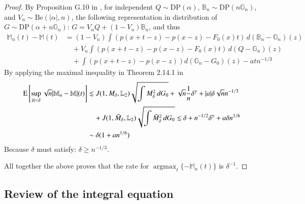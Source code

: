 \begin{proof}
By Proposition G.10 in \cite{4}, for independent \( Q \sim \text{DP}(\alpha) \), \( \mathbb{B}_n \sim \text{DP}(n \mathbb{G}_n) \), and \( V_n \sim \text{Be}(|\alpha|, n) \), the following representation in distribution of $G \sim \mathrm{DP}(\alpha + n \mathbb{G}_n)$: $G = V_n Q  + (1 - V_n) \mathbb{B}_n $, and thus
\begin{align}
\mathbb{M}_n(t) - \mathbb{M}(t) &= (1-V_n) \int \left( p(x+t-z) - p(x-z) - F_0(x)t \right) \, d(\mathbb{B}_n - \mathbb{G}_n)(z) \\
&\quad + V_n \int \left( p(x+t-z) - p(x-z) - F_0(x)t \right) \, d(Q-\mathbb{G}_n)(z) \\
&\quad + \int \left( p(x+t-z) - p(x-z) \right) d(\mathbb{G}_n - G_0)(z) - a t n^{-1/3} 
\end{align}
By applying the maximal inequality in Theorem 2.14.1 in \cite{5}
\begin{align*} 
	\mathrm{E} \left[ \sup_{|t|<\delta} \sqrt{n} |\mathbb{M}_n - \mathbb{M}|(t) \right] &\lesssim J(1, M_\delta, \mathbb{L}_2) \sqrt{\int M_\delta^2 \, dG_0} + \sqrt{n} \frac{1}{n} \delta^\gamma + |a| \delta \sqrt{n} n^{-1/3} \\ 
	& \quad + J(1, \tilde{M}_\delta, \mathbb{L}_2) \sqrt{\int \tilde{M}_\delta^2 \, dG_0} \lesssim \delta + n^{-1/2} \delta^\gamma + a \delta n^{1/6} \\
	&\sim \delta(1 + a n^{1/6}) \end{align*}
Because $\delta$ must satisfy: $\delta \ge n^{-1/3}$. 

All together the above
proves that the rate for $\operatorname{argmax}_t \{-\mathbb{M}_n(t)\}$ is $\delta^{-1}$.
\end{proof}
\subsection{Review of the integral equation}\label{sec: review integral equation}


